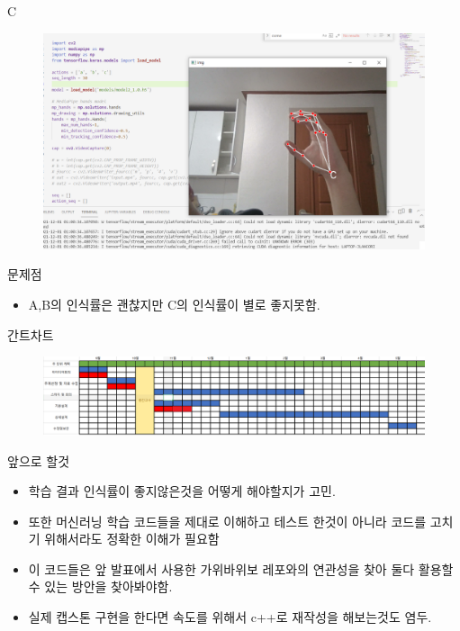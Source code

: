 \documentclass[10pt]{beamer}
\begin{document}
\begin{frame}{C}
    \begin{figure}
        \includegraphics[width=0.8\columnwidth]{C.png}
    \end{figure}
\end{frame}



\begin{frame}{문제점}
    \begin{itemize}
        \item A,B의 인식률은 괜찮지만 C의 인식률이 별로 좋지못함.
    \end{itemize}
\end{frame}




\begin{frame}{간트차트}
    \begin{figure}
        \includegraphics[width=1\columnwidth]{gant.png}
    \end{figure}
\end{frame}

\begin{frame}{앞으로 할것}
    \begin{itemize}
        \item 학습 결과 인식률이 좋지않은것을 어떻게 해야할지가 고민.
        \item 또한 머신러닝 학습 코드들을 제대로 이해하고 테스트 한것이 아니라 코드를 고치기 위해서라도 정확한 이해가 필요함
        \item 이 코드들은 앞 발표에서 사용한 가위바위보 레포와의 연관성을 찾아 둘다 활용할 수 있는 방안을 찾아봐야함.
        \item 실제 캡스톤 구현을 한다면 속도를 위해서 c++로 재작성을 해보는것도 염두.
    \end{itemize}
\end{frame}
\end{document}
